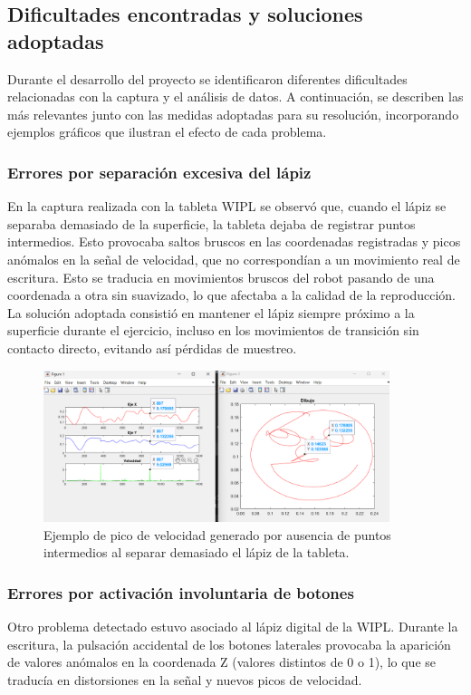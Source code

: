 \documentclass[12pt,a4paper,oneside]{report}
\begin{document}
\subsection{Dificultades encontradas y soluciones adoptadas}

Durante el desarrollo del proyecto se identificaron diferentes 
dificultades relacionadas con la captura y el análisis de datos. 
A continuación, se describen las más relevantes junto con las 
medidas adoptadas para su resolución, incorporando ejemplos 
gráficos que ilustran el efecto de cada problema.

\subsubsection*{Errores por separación excesiva del lápiz}
En la captura realizada con la tableta \acrshort{WIPL} se 
observó que, cuando el lápiz se separaba demasiado de la 
superficie, la tableta dejaba de registrar puntos intermedios. 
Esto provocaba saltos bruscos en las coordenadas registradas y 
picos anómalos en la señal de velocidad, que no correspondían a 
un movimiento real de escritura. Esto se traducia en movimientos bruscos 
del robot pasando de una coordenada a otra sin suavizado, 
lo que afectaba a la calidad de la reproducción.
La solución adoptada consistió en mantener el lápiz siempre 
próximo a la superficie durante el ejercicio, incluso en los 
movimientos de transición sin contacto directo, evitando así 
pérdidas de muestreo.

\begin{figure}[H]
  \centering
  \includegraphics[width=0.9\textwidth]{figuras/prueba_picovelocidad.png}
  \caption{Ejemplo de pico de velocidad generado por ausencia de 
           puntos intermedios al separar demasiado el lápiz de la 
           tableta.}
  \label{fig:picoVelocidad}
\end{figure}

\subsubsection*{Errores por activación involuntaria de botones}
Otro problema detectado estuvo asociado al lápiz digital de la 
\acrshort{WIPL}. Durante la escritura, la pulsación accidental 
de los botones laterales provocaba la aparición de valores 
anómalos en la coordenada Z (valores distintos de 0 o 1), lo que 
se traducía en distorsiones en la señal y nuevos picos de 
velocidad.  
\end{document}
